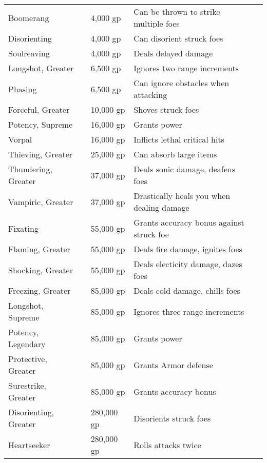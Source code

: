 \begin{longtabuwrapper}
\begin{longtabu}{l l l X l}
Boomerang &  & 4,000 gp & Can be thrown to strike multiple foes & \pageref{item:Boomerang} \\
Disorienting &  & 4,000 gp & Can disorient struck foes & \pageref{item:Disorienting} \\
Soulreaving &  & 4,000 gp & Deals delayed damage & \pageref{item:Soulreaving} \\
Longshot, Greater &  & 6,500 gp & Ignores two range increments & \pageref{item:Longshot, Greater} \\
Phasing &  & 6,500 gp & Can ignore obstacles when attacking & \pageref{item:Phasing} \\
Forceful, Greater &  & 10,000 gp & Shoves struck foes & \pageref{item:Forceful, Greater} \\
Potency, Supreme &  & 16,000 gp & Grants  power & \pageref{item:Potency, Supreme} \\
Vorpal &  & 16,000 gp & Inflicts lethal critical hits & \pageref{item:Vorpal} \\
Thieving, Greater &  & 25,000 gp & Can absorb large items & \pageref{item:Thieving, Greater} \\
Thundering, Greater &  & 37,000 gp & Deals sonic damage, deafens foes & \pageref{item:Thundering, Greater} \\
Vampiric, Greater &  & 37,000 gp & Drastically heals you when dealing damage & \pageref{item:Vampiric, Greater} \\
Fixating &  & 55,000 gp & Grants accuracy bonus against struck foe & \pageref{item:Fixating} \\
Flaming, Greater &  & 55,000 gp & Deals fire damage, ignites foes & \pageref{item:Flaming, Greater} \\
Shocking, Greater &  & 55,000 gp & Deals electicity damage, dazes foes & \pageref{item:Shocking, Greater} \\
Freezing, Greater &  & 85,000 gp & Deals cold damage, chills foes & \pageref{item:Freezing, Greater} \\
Longshot, Supreme &  & 85,000 gp & Ignores three range increments & \pageref{item:Longshot, Supreme} \\
Potency, Legendary &  & 85,000 gp & Grants  power & \pageref{item:Potency, Legendary} \\
Protective, Greater &  & 85,000 gp & Grants  Armor defense & \pageref{item:Protective, Greater} \\
Surestrike, Greater &  & 85,000 gp & Grants  accuracy bonus & \pageref{item:Surestrike, Greater} \\
Disorienting, Greater &  & 280,000 gp & Disorients struck foes & \pageref{item:Disorienting, Greater} \\
Heartseeker &  & 280,000 gp & Rolls attacks twice & \pageref{item:Heartseeker} \\
\end{longtabu}
\end{longtabuwrapper}
